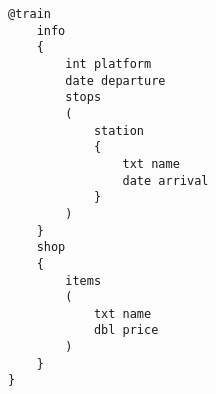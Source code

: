 \begin{lstlisting}
@train
	info
	{
		int platform
		date departure
		stops
		(
			station
			{
				txt name
				date arrival
			}
		)
	}
	shop
	{
		items
		(
			txt name
			dbl price
		)
	}
}
\end{lstlisting}
